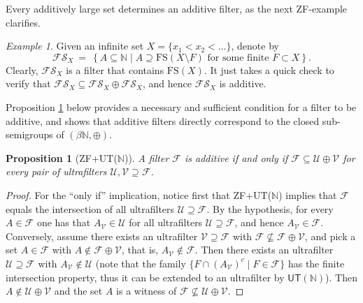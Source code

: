 \documentclass{amsart}
\newtheorem{proposition}[theorem]{Proposition}
\theoremstyle{definition}
\theoremstyle{remark}
\newtheorem{example}[theorem]{Example}
\def\F{\mathscr{F}}
\def\U{\mathscr{U}}
\def\V{\mathscr{V}}
\def\N{\mathbb{N}}
\begin{document}
Every additively large set determines an additive filter, as the
next \textsf{ZF}-example clarifies.

\begin{example}\label{fsx}
Given an infinite set $X=\{x_1<x_2<\ldots\}$, denote by
$$\mathcal{FS}_X\ =\ 
\left\{A\subseteq\N\mid A\supseteq\text{FS}(X\setminus F)
\text{ for some finite }F\subset X\right\}.$$
Clearly, $\mathcal{FS}_X$ is a filter that 
contains $\text{FS}(X)$. It just takes a quick check to verify that
$\mathcal{FS}_X\subseteq\mathcal{FS}_X\oplus\mathcal{FS}_X$,
and hence $\mathcal{FS}_X$ is additive.
\end{example}



Proposition \ref{char_addfil} below
provides a necessary and sufficient condition for a filter to be additive, and shows that
additive filters directly correspond to the closed 
sub-semigroups of $(\beta\N,\oplus)$.

\begin{proposition}[\textsf{ZF+UT}($\N$)]\label{char_addfil}
A filter $\F$ is additive if and only if 
$\F\subseteq\U\oplus\V$ for every pair of ultrafilters $\U,\V\supseteq\F$.
\end{proposition}

\begin{proof}
For the ``only if'' implication, notice first that \textsf{ZF+UT}($\N$)
implies that $\F$ equals the intersection of all
ultrafilters $\U\supseteq\F$. By the hypothesis, for every $A\in\F$
one has that $A_\V\in\U$ for all ultrafilters $\U\supseteq\F$,
and hence $A_\V\in\F$. Conversely,
assume there exists an ultrafilter $\V\supseteq\F$
with $\F\not\subseteq\F\oplus\V$, and pick
a set $A\in\F$ with $A\notin\F\oplus\V$, that is, $A_\V\notin\F$.
Then there exists an ultrafilter
$\U\supseteq\F$ with $A_\V\notin\U$
(note that the family $\{F\cap(A_\V)^c\mid F\in\F\}$ has
the finite intersection property, thus it can be extended to an ultrafilter
by $\textsf{UT}(\N)$).
Then $A\notin\U\oplus\V$ and the 
set $A$ is a witness of $\F\not\subseteq\U\oplus\V$.
\end{proof}
\end{document}
